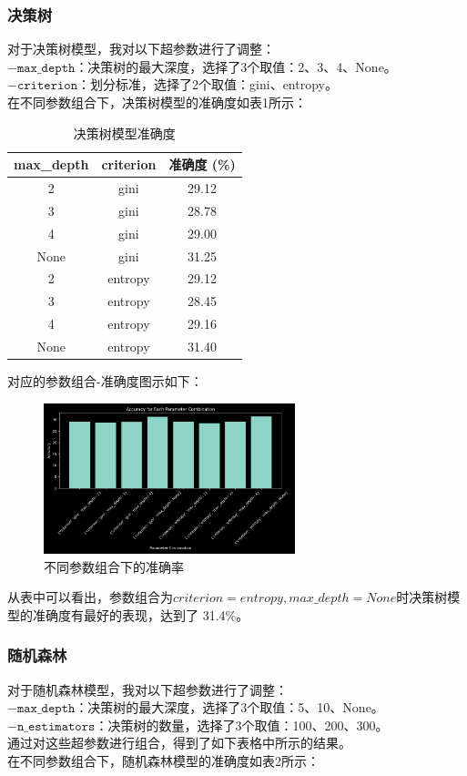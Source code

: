 \documentclass[12pt,a4paper]{article}
\begin{document}
\subsubsection{决策树}
对于决策树模型，我对以下超参数进行了调整：\\
$- \texttt{max\_depth}$：决策树的最大深度，选择了3个取值：2、3、4、None。\\
$- \texttt{criterion}$：划分标准，选择了2个取值：gini、entropy。\\
在不同参数组合下，决策树模型的准确度如表1所示：\\
\begin{table}[H]
    \centering
    \caption{决策树模型准确度}
    \label{tab:dt_performance}
    \begin{tabular}{ccc}
      \toprule
      max\_depth & criterion & 准确度 (\%) \\
      \midrule
      2 & gini &  29.12 \\
      3 & gini &  28.78 \\
      4 & gini &  29.00 \\
      None & gini &  31.25 \\
      2 & entropy &  29.12 \\
      3 & entropy &  28.45 \\
      4 & entropy &  29.16 \\
      None & entropy &  31.40 \\
      \bottomrule
    \end{tabular}
  \end{table}
对应的参数组合-准确度图示如下：
\begin{figure}[H]
    \centering
    \includegraphics[width=0.65\textwidth]{plot1.png}
    \caption{不同参数组合下的准确率}
    \label{fig:accuracy}
  \end{figure}
从表中可以看出，参数组合为$criterion = entropy, max\_depth=None$时决策树模型的准确度有最好的表现，达到了 31.4\%。

\subsubsection{随机森林}
对于随机森林模型，我对以下超参数进行了调整：\\
$- \texttt{max\_depth}$：决策树的最大深度，选择了3个取值：5、10、None。\\
$- \texttt{n\_estimators}$：决策树的数量，选择了3个取值：100、200、300。\\
通过对这些超参数进行组合，得到了如下表格中所示的结果。\\
在不同参数组合下，随机森林模型的准确度如表2所示：
\end{document}
